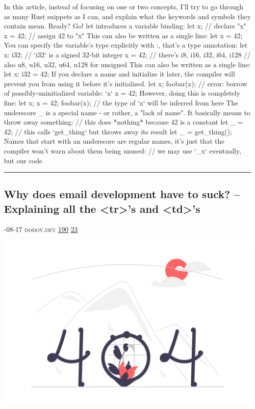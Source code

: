 \documentclass[10pt,a4paper]{article}
\begin{document}
\begin{multicols*}{2}
In this article, instead of focusing on one or two concepts, I'll try to go through as many Rust snippets as I can, and explain what the keywords and symbols they contain mean.
Ready? Go!
let introduces a variable binding:
let x; // declare "x" x = 42; // assign 42 to "x"
This can also be written as a single line:
let x = 42;
You can specify the variable's type explicitly with
:, that's a type annotation:
let x: i32; // `i32` is a signed 32-bit integer x = 42; // there's i8, i16, i32, i64, i128 // also u8, u16, u32, u64, u128 for unsigned
This can also be written as a single line:
let x: i32 = 42;
If you declare a name and initialize it later, the compiler will prevent you from using it before it's initialized.
let x; foobar(x); // error: borrow of possibly-uninitialized variable: `x` x = 42;
However, doing this is completely fine:
let x; x = 42; foobar(x); // the type of `x` will be inferred from here
The underscore
\_ is a special name - or rather, a "lack of name". It
basically means to throw away something:
// this does *nothing* because 42 is a constant let \_ = 42; // this calls `get\_thing` but throws away its result let \_ = get\_thing();
Names that start with an underscore are regular names, it's just that the compiler won't warn about them being unused:
// we may use `\_x` eventually, but our code 
\par\noindent\textcolor{red}{\rule{\linewidth}{0.2mm}}
\vfill
\null
\noindent\begin{minipage}{\linewidth}
\subsection{Why does email development have to suck? – Explaining all the <tr>'s and <td>'s}
\textsc{\footnotesize
{\scriptsize\faCalendar}-08-17 
{\scriptsize\faGlobe}\space 
dodov.dev 
{\scriptsize\faThumbsOUp}\space 
\href{http://news.ycombinator.com/item?id=37163784\&utm\_term=comment}{190} 
{\scriptsize\faComments}\space 
\href{http://news.ycombinator.com/item?id=37163784\&utm\_term=comment}{23} 
}
\par\medskip\noindent
\href{https://dodov.dev/blog/why-does-email-development-have-to-suck?utm\_source=hackernewsletter\&utm\_medium=email\&utm\_term=code}{
    \includegraphics[width=0.99\linewidth]{notfound.png}
}
\end{minipage}

\end{multicols*}
\end{document}

